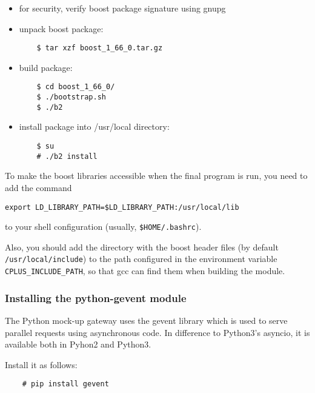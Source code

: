 \documentclass{scrartcl}[12pt,a4paper]
\begin{document}
\begin{itemize}
\item for security, verify boost package signature using gnupg

\item unpack boost package:
  
  \begin{verbatim}
    $ tar xzf boost_1_66_0.tar.gz
  \end{verbatim}    

\item build package:

  \begin{verbatim}
    $ cd boost_1_66_0/
    $ ./bootstrap.sh
    $ ./b2
  \end{verbatim}    

\item install package into /usr/local directory:

  \begin{verbatim}
    $ su
    # ./b2 install
  \end{verbatim}    
\end{itemize}

To make the boost libraries accessible when the
final program is run, you need to add the
command

\begin{verbatim}
export LD_LIBRARY_PATH=$LD_LIBRARY_PATH:/usr/local/lib
\end{verbatim}

to your shell configuration (usually, \verb+$HOME/.bashrc+).

Also, you should add the directory with the boost header files (by
default \verb+/usr/local/include+) to the path configured in the environment
variable \verb+CPLUS_INCLUDE_PATH+, so that gcc can find them when building
the module.

\subsubsection{Installing the python-gevent module}

The Python mock-up gateway uses the gevent
library which is used to serve parallel requests
using asynchronous code. In difference to
Python3's asyncio, it is available both in
Pyhon2 and Python3.

Install it as follows:

  \begin{verbatim}
    # pip install gevent
  \end{verbatim}    
\end{document}
